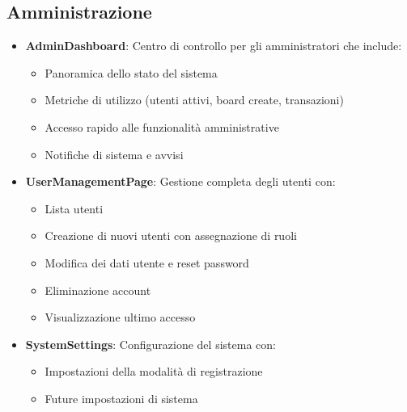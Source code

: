 \documentclass[11pt]{article}
\begin{document}
\subsection{Amministrazione}
\begin{itemize}
    \item \textbf{AdminDashboard}: Centro di controllo per gli amministratori che include:
    \begin{itemize}
        \item Panoramica dello stato del sistema
        \item Metriche di utilizzo (utenti attivi, board create, transazioni)
        \item Accesso rapido alle funzionalità amministrative
        \item Notifiche di sistema e avvisi
    \end{itemize}

    \item \textbf{UserManagementPage}: Gestione completa degli utenti con:
    \begin{itemize}
        \item Lista utenti
        \item Creazione di nuovi utenti con assegnazione di ruoli
        \item Modifica dei dati utente e reset password
        \item Eliminazione account
        \item Visualizzazione ultimo accesso
    \end{itemize}

    \item \textbf{SystemSettings}: Configurazione del sistema con:
    \begin{itemize}
        \item Impostazioni della modalità di registrazione
        \item Future impostazioni di sistema
    \end{itemize}
\end{itemize}
\end{document}
